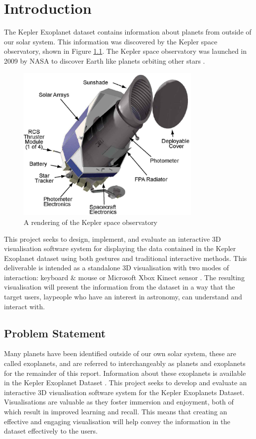 \chapter{Introduction}\label{C:intro}
The Kepler Exoplanet dataset \cite{datasetphl} \cite{dataset}  contains information about planets from outside of
our solar system. This information was discovered by the Kepler space observatory, shown in Figure
\ref{fig:keplerTele}. The Kepler space observatory was launched in 2009 by NASA
to discover Earth like planets orbiting other stars \cite{keplerTele}.

\begin{figure}[H]
  \centering
      \includegraphics[width=0.8\textwidth]{images/keplerTele.jpg}
  \caption[Kepler space observatory]{A rendering of the Kepler space observatory}  
    \label{fig:keplerTele}
\end{figure}

This project seeks to design, implement, and evaluate an interactive 3D
visualisation software system for displaying the data contained in the Kepler
Exoplanet dataset using both gestures and traditional interactive methods. This deliverable is intended as a standalone
3D visualisation with two modes of interaction: keyboard \& mouse or Microsoft
Xbox Kinect sensor \cite{kinect}. The resulting visualisation will present the
information from the dataset in a way that the target users, laypeople who have
an
interest in astronomy, can understand and interact with.
\section{Problem Statement}
Many planets have been identified outside of our own solar system,
these are called exoplanets, and are referred to interchangeably as planets and
exoplanets for the remainder of this report. Information about these exoplanets
is available in the Kepler Exoplanet Dataset
. This project seeks to develop and evaluate an interactive 3D
visualisation software system for the Kepler Exoplanets Dataset. Visualisations
are valuable as they foster immersion and enjoyment, both of which result in
improved learning and recall. This means that
creating an effective and engaging visualisation will help convey the
information
in the dataset effectively to the users.

